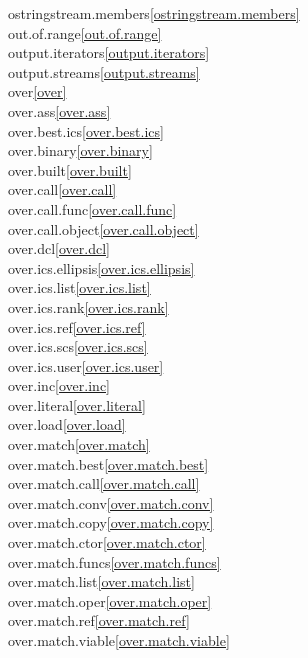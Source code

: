 \begin{multicols}{2}
ostringstream.members\quad\ref{ostringstream.members}\\
out.of.range\quad\ref{out.of.range}\\
output.iterators\quad\ref{output.iterators}\\
output.streams\quad\ref{output.streams}\\
over\quad\ref{over}\\
over.ass\quad\ref{over.ass}\\
over.best.ics\quad\ref{over.best.ics}\\
over.binary\quad\ref{over.binary}\\
over.built\quad\ref{over.built}\\
over.call\quad\ref{over.call}\\
over.call.func\quad\ref{over.call.func}\\
over.call.object\quad\ref{over.call.object}\\
over.dcl\quad\ref{over.dcl}\\
over.ics.ellipsis\quad\ref{over.ics.ellipsis}\\
over.ics.list\quad\ref{over.ics.list}\\
over.ics.rank\quad\ref{over.ics.rank}\\
over.ics.ref\quad\ref{over.ics.ref}\\
over.ics.scs\quad\ref{over.ics.scs}\\
over.ics.user\quad\ref{over.ics.user}\\
over.inc\quad\ref{over.inc}\\
over.literal\quad\ref{over.literal}\\
over.load\quad\ref{over.load}\\
over.match\quad\ref{over.match}\\
over.match.best\quad\ref{over.match.best}\\
over.match.call\quad\ref{over.match.call}\\
over.match.conv\quad\ref{over.match.conv}\\
over.match.copy\quad\ref{over.match.copy}\\
over.match.ctor\quad\ref{over.match.ctor}\\
over.match.funcs\quad\ref{over.match.funcs}\\
over.match.list\quad\ref{over.match.list}\\
over.match.oper\quad\ref{over.match.oper}\\
over.match.ref\quad\ref{over.match.ref}\\
over.match.viable\quad\ref{over.match.viable}\\

\end{multicols}
